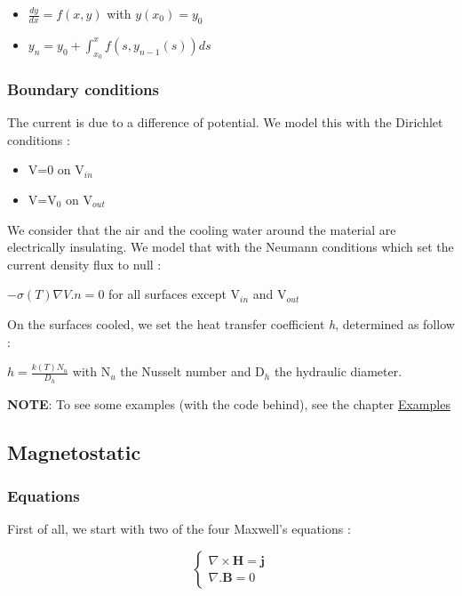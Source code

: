\documentclass[11pt]{amsart}
\newcommand{\admonition}[2]{\textbf{#1}: {#2}}
\begin{document}
\begin{itemize}

\item $\frac{dy}{dx}=f(x,y)$ with $y(x_{0})=y_{0}$

\item $y_{n}=y_{0}+\int_{x_{0}}^{x}f(s,y_{n-1}(s))ds$

\end{itemize}


\hypertarget{x-boundary-conditions}{\subsubsection{Boundary conditions}}
The current is due to a difference of potential. We model this with the Dirichlet conditions :


\begin{itemize}

\item V=0 on V${}_{in}$

\item V=V${}_{0}$ on V${}_{out}$

\end{itemize}


We consider that the air and the cooling water around the material are electrically insulating. We model that with the Neumann conditions which set the current density flux to null :


$-\sigma(T)\nabla V.n=0$ for all surfaces except V${}_{in}$ and V${}_{out}$


On the surfaces cooled, we set the heat transfer coefficient \emph{h}, determined as follow :


$h=\frac{k(T)N_{u}}{D_{h}}$ with N${}_{u}$ the Nusselt number and D${}_{h}$ the hydraulic diameter.


\admonition{NOTE}{To see some examples (with the code behind), see the chapter \href{/examples}{Examples}}
\hypertarget{x-magnetostatic}{\subsection{Magnetostatic}}
\hypertarget{x-equations}{\subsubsection{Equations}}
First of all, we start with two of the four Maxwell’s equations :



\[
    \left\{ \begin{array}{cc}
      \nabla\times\textbf{H}=\textbf{j}\\
      \nabla.\textbf{B}=0 \end{array} \right.
\]
\end{document}
